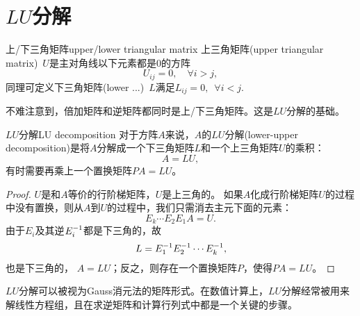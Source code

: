 \section{\texorpdfstring{$LU$}{LU}分解}
\begin{definition}{上/下三角矩阵}{upper/lower triangular matrix}
	上三角矩阵(upper triangular matrix)~$U$是主对角线以下元素都是0的方阵
	\[
		U_{ij}=0,\quad\forall i>j,
	\]
	同理可定义下三角矩阵(lower ...)~$L$满足$L_{ij}=0,\enspace\forall i<j.$
\end{definition}
不难注意到，倍加矩阵和逆矩阵都同时是上/下三角矩阵。这是$LU$分解的基础。
\begin{theorem}{$LU$分解}{LU decomposition}
	对于方阵$A$来说，$A$的$LU$分解(lower-upper decomposition)是将$A$分解成一个下三角矩阵$L$和一个上三角矩阵$U$的乘积：
	\begin{equation}
		A=LU,
	\end{equation}
	有时需要再乘上一个置换矩阵$PA=LU$。
\end{theorem}
\begin{proof}
	$U$是和$A$等价的行阶梯矩阵，$U$是上三角的。
	如果$A$化成行阶梯矩阵$U$的过程中没有置换，则从$A$到$U$的过程中，我们只需消去主元下面的元素：
	\[
		E_k\cdots E_2E_1A=U.
	\]
	由于$E_i$及其逆$E_i^{-1}$都是下三角的，故
	\[
		L=E_1^{-1} E_2^{-1}\cdots E_k^{-1},
	\]
	也是下三角的，%
	$A=LU$；反之，则存在一个置换矩阵$P$，使得$PA=LU$。
\end{proof}
$LU$分解可以被视为Gauss消元法的矩阵形式。在数值计算上，$LU$分解经常被用来解线性方程组，且在求逆矩阵和计算行列式中都是一个关键的步骤。


